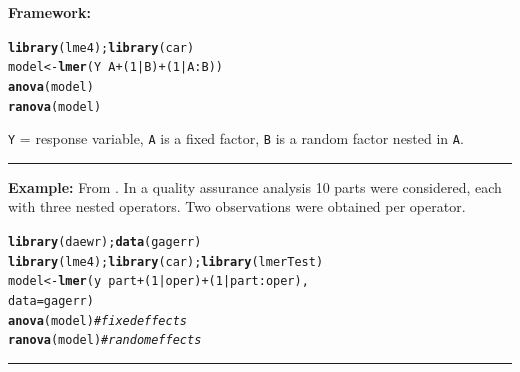 \documentclass[12pt,english]{article}\usepackage[]{graphicx}\usepackage[table]{xcolor}
\makeatletter
\newcommand{\hlnum}[1]{\textcolor[rgb]{0.686,0.059,0.569}{#1}}%
\newcommand{\hlcom}[1]{\textcolor[rgb]{0.678,0.584,0.686}{\textit{#1}}}%
\newcommand{\hlopt}[1]{\textcolor[rgb]{0,0,0}{#1}}%
\newcommand{\hldef}[1]{\textcolor[rgb]{0.345,0.345,0.345}{#1}}%
\newcommand{\hlkwb}[1]{\textcolor[rgb]{0.69,0.353,0.396}{#1}}%
\newcommand{\hlkwc}[1]{\textcolor[rgb]{0.333,0.667,0.333}{#1}}%
\newcommand{\hlkwd}[1]{\textcolor[rgb]{0.737,0.353,0.396}{\textbf{#1}}}%
\newenvironment{kframe}{%
 \def\at@end@of@kframe{}%
 \ifinner\ifhmode%
  \def\at@end@of@kframe{\end{minipage}}%
  \begin{minipage}{\columnwidth}%
 \fi\fi%
 \def\FrameCommand##1{\hskip\@totalleftmargin \hskip-\fboxsep
 \colorbox{shadecolor}{##1}\hskip-\fboxsep
     \hskip-\linewidth \hskip-\@totalleftmargin \hskip\columnwidth}%
 \MakeFramed {\advance\hsize-\width
   \@totalleftmargin\z@ \linewidth\hsize
   \@setminipage}}%
 {\par\unskip\endMakeFramed%
 \at@end@of@kframe}
\newenvironment{knitrout}{}{} %
\makeatother
\begin{document}
\begin{tcolorbox}[colback=yellow!50!red!25!white,colbacktitle=yellow!50!red,colframe=black!75!white,title=\textbf{R:} NSE - One Random Nested Factor]
\textbf{Framework:}\\
\vspace{-.2in}
\begin{knitrout}
\color{fgcolor}\begin{kframe}
\begin{alltt}
\hlkwd{library}\hldef{(lme4);} \hlkwd{library}\hldef{(car)}
\hldef{model} \hlkwb{<-} \hlkwd{lmer}\hldef{(Y} \hlopt{~} \hldef{A} \hlopt{+} \hldef{(}\hlnum{1}\hlopt{|}\hldef{B)} \hlopt{+} \hldef{(}\hlnum{1}\hlopt{|}\hldef{A}\hlopt{:}\hldef{B))}
\hlkwd{anova}\hldef{(model)}
\hlkwd{ranova}\hldef{(model)}
\end{alltt}
\end{kframe}
\end{knitrout}
\texttt{Y} = response variable, \texttt{A} is a fixed factor, \texttt{B} is a random factor nested in \texttt{A}.
\vspace{0.1in}
\par\noindent\rule{.9\textwidth}{0.4pt}

\textbf{Example:} From \citep[][pgs 156-159]{lawson}.  In a quality assurance analysis 10 parts were considered, each with three nested operators.  Two observations were obtained per operator.
\vspace{0.1in}\\

\vspace{-.1in}
\begin{knitrout}
\color{fgcolor}\begin{kframe}
\begin{alltt}
\hlkwd{library}\hldef{(daewr);} \hlkwd{data}\hldef{(gagerr)}
\hlkwd{library}\hldef{(lme4);} \hlkwd{library}\hldef{(car);} \hlkwd{library}\hldef{(lmerTest)}
\hldef{model} \hlkwb{<-} \hlkwd{lmer}\hldef{(y} \hlopt{~} \hldef{part} \hlopt{+} \hldef{(}\hlnum{1}\hlopt{|}\hldef{oper)} \hlopt{+} \hldef{(}\hlnum{1}\hlopt{|}\hldef{part}\hlopt{:}\hldef{oper),}
              \hlkwc{data} \hldef{= gagerr)}
\hlkwd{anova}\hldef{(model)} \hlcom{# fixed effects}
\hlkwd{ranova}\hldef{(model)} \hlcom{# random effects}
\end{alltt}
\end{kframe}
\end{knitrout}
\end{tcolorbox}
\par\noindent\rule{.9\textwidth}{0.4pt}
\end{document}
